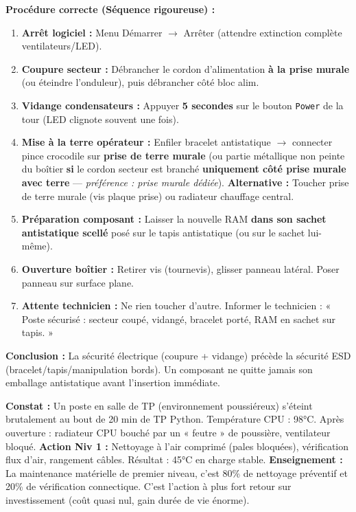 \documentclass[11pt]{article}
\newcounter{popsec}
\newcounter{popsub}
\newcommand{\courssub}[1]{%
  \stepcounter{popsub}%
  \par\vspace{9pt}\noindent{\popxbold\fontsize{11.5}{13}\selectfont\color{popink}{\color{poporange}\thepopsec.\thepopsub}\hspace{6pt}#1}\par\nopagebreak\vspace{4pt}
}
\begin{document}
\begin{exoresolu}
\textbf{Procédure correcte (Séquence rigoureuse) :}
\begin{enumerate}
    \item \textbf{Arrêt logiciel :} Menu Démarrer $\rightarrow$ Arrêter (attendre extinction complète ventilateurs/LED).
    \item \textbf{Coupure secteur :} Débrancher le cordon d'alimentation \textbf{à la prise murale} (ou éteindre l'onduleur), puis débrancher côté bloc alim.
    \item \textbf{Vidange condensateurs :} Appuyer \textbf{5 secondes} sur le bouton \texttt{Power} de la tour (LED clignote souvent une fois).
    \item \textbf{Mise à la terre opérateur :} Enfiler bracelet antistatique $\rightarrow$ connecter pince crocodile sur \textbf{prise de terre murale} (ou partie métallique non peinte du boîtier \textbf{si} le cordon secteur est branché \textbf{uniquement côté prise murale avec terre} — \emph{préférence : prise murale dédiée}). \textbf{Alternative :} Toucher prise de terre murale (vis plaque prise) ou radiateur chauffage central.
    \item \textbf{Préparation composant :} Laisser la nouvelle RAM \textbf{dans son sachet antistatique scellé} posé sur le tapis antistatique (ou sur le sachet lui-même).
    \item \textbf{Ouverture boîtier :} Retirer vis (tournevis), glisser panneau latéral. Poser panneau sur surface plane.
    \item \textbf{Attente technicien :} Ne rien toucher d'autre. Informer le technicien : « Poste sécurisé : secteur coupé, vidangé, bracelet porté, RAM en sachet sur tapis. »
\end{enumerate}
\textbf{Conclusion :} La sécurité électrique (coupure + vidange) précède la sécurité ESD (bracelet/tapis/manipulation bords). Un composant ne quitte jamais son emballage antistatique avant l'insertion immédiate.
\end{exoresolu}

\courssub{Maintenance matérielle de premier niveau}

\begin{experience}
    \textbf{Constat :} Un poste en salle de TP (environnement poussiéreux) s'éteint brutalement au bout de 20 min de TP Python. Température CPU : 98°C. Après ouverture : radiateur CPU bouché par un « feutre » de poussière, ventilateur bloqué.
    \textbf{Action Niv 1 :} Nettoyage à l'air comprimé (pales bloquées), vérification flux d'air, rangement câbles. Résultat : 45°C en charge stable.
    \textbf{Enseignement :} La maintenance matérielle de premier niveau, c'est 80\% de nettoyage préventif et 20\% de vérification connectique. C'est l'action à plus fort retour sur investissement (coût quasi nul, gain durée de vie énorme).
\end{experience}
\end{document}
